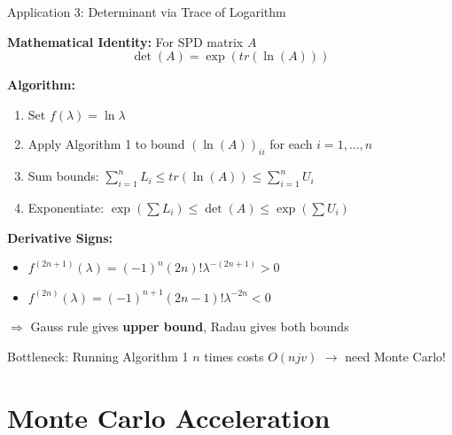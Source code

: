 \documentclass[aspectratio=169, 12pt]{beamer}
\begin{document}
\begin{frame}{Application 3: Determinant via Trace of Logarithm}

\textbf{Mathematical Identity:} For SPD matrix \(A\)
\[
\det(A) = \exp(tr(\ln(A)))
\]

\vspace{0.3cm}

\textbf{Algorithm:}
\begin{enumerate}
    \item Set \(f(\lambda) = \ln \lambda\)
    \item Apply Algorithm 1 to bound \((\ln(A))_{ii}\) for each \(i = 1, \ldots, n\)
    \item Sum bounds: \(\sum_{i=1}^n L_i \leq tr(\ln(A)) \leq \sum_{i=1}^n U_i\)
    \item Exponentiate: \(\exp(\sum L_i) \leq \det(A) \leq \exp(\sum U_i)\)
\end{enumerate}

\vspace{0.3cm}

\textbf{Derivative Signs:}
\begin{itemize}
    \item \(f^{(2n+1)}(\lambda) = (-1)^n (2n)! \lambda^{-(2n+1)} > 0\)
    \item \(f^{(2n)}(\lambda) = (-1)^{n+1} (2n-1)! \lambda^{-2n} < 0\)
\end{itemize}
\(\Rightarrow\) Gauss rule gives \textbf{upper bound}, Radau gives both bounds

\vspace{0.3cm}

\alert{Bottleneck:} Running Algorithm 1 \(n\) times costs \(O(njv)\) \(\rightarrow\) need Monte Carlo!

\end{frame}

\section{Monte Carlo Acceleration}
\end{document}
